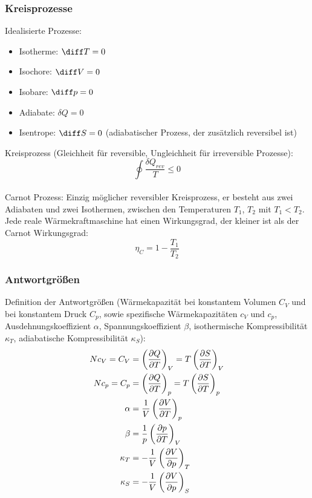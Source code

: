 \documentclass[11pt]{article}
\numberwithin{equation}{section}
\begin{document}
      \subsubsection{Kreisprozesse}
        Idealisierte Prozesse:
        \begin{itemize}
          \item Isotherme: $\diff T = 0$
          \item Isochore: $\diff V = 0$
          \item Isobare: $\diff p = 0$
          \item Adiabate: $\delta Q = 0$
          \item Isentrope: $\diff S = 0$ (adiabatischer Prozess, der zusätzlich reversibel ist)
        \end{itemize}

        Kreisprozess (Gleichheit für reversible, Ungleichheit für irreversible Prozesse):
        \begin{equation}
          \oint \frac{\delta Q_{rev}}{T} \le 0
        \end{equation}\\

        Carnot Prozess: Einzig möglicher reversibler Kreisprozess, er besteht aus zwei Adiabaten und zwei Isothermen, zwischen den Temperaturen $T_1$, $T_2$ mit $T_1 < T_2$. Jede reale Wärmekraftmaschine hat einen Wirkungsgrad, der kleiner ist als der Carnot Wirkungsgrad:
        \begin{equation}
          \eta_C = 1-\frac{T_1}{T_2}
        \end{equation}

      \subsubsection{Antwortgrößen}
        Definition der Antwortgrößen (Wärmekapazität bei konstantem Volumen $C_V$ und bei konstantem Druck $C_p$, sowie spezifische Wärmekapazitäten $c_V$ und $c_p$, Ausdehnungskoeffizient $\alpha$, Spannungskoeffizient $\beta$, isothermische Kompressibilität $\kappa_T$, adiabatische Kompressibilität $\kappa_S$):
        \begin{equation}
          \begin{aligned}
            N c_V = C_V &= \left( \frac{\partial Q}{\partial T} \right)_V = T \left( \frac{\partial S}{\partial T} \right)_V \\
            N c_p = C_p &= \left( \frac{\partial Q}{\partial T} \right)_p = T \left( \frac{\partial S}{\partial T} \right)_p \\
            \alpha &= \frac{1}{V} \left( \frac{\partial V}{\partial T} \right)_p \\
            \beta &= \frac{1}{p} \left( \frac{\partial p}{\partial T} \right)_V \\
            \kappa_T &= -\frac{1}{V} \left( \frac{\partial V}{\partial p} \right)_T \\
            \kappa_S &= -\frac{1}{V} \left( \frac{\partial V}{\partial p} \right)_S \\
          \end{aligned}
        \end{equation}
\end{document}
